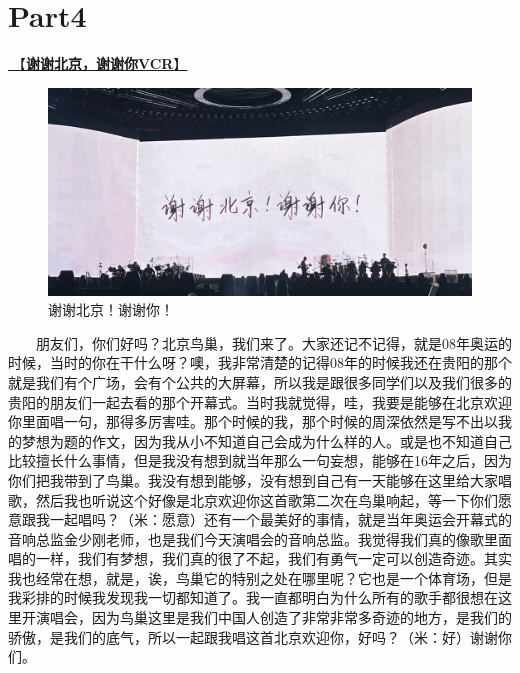 \documentclass[]{ctexbook}
\begin{document}
\newpage

\section{Part4}\label{beijing-20240921-part4}

\hyperref[thank-you-vcr]{🎥【\textbf{谢谢北京，谢谢你VCR}】}

\begin{figure}

{\centering \includegraphics[width=400pt]{img/beijing20240921/thank-beijing} 

}

\caption{谢谢北京！谢谢你！}\label{fig:unnamed-chunk-99}
\end{figure}

  朋友们，你们好吗？北京鸟巢，我们来了。大家还记不记得，就是08年奥运的时候，当时的你在干什么呀？噢，我非常清楚的记得08年的时候我还在贵阳的那个就是我们有个广场，会有个公共的大屏幕，所以我是跟很多同学们以及我们很多的贵阳的朋友们一起去看的那个开幕式。当时我就觉得，哇，我要是能够在北京欢迎你里面唱一句，那得多厉害哇。那个时候的我，那个时候的周深依然是写不出以我的梦想为题的作文，因为我从小不知道自己会成为什么样的人。或是也不知道自己比较擅长什么事情，但是我没有想到就当年那么一句妄想，能够在16年之后，因为你们把我带到了鸟巢。我没有想到能够，没有想到自己有一天能够在这里给大家唱歌，然后我也听说这个好像是北京欢迎你这首歌第二次在鸟巢响起，等一下你们愿意跟我一起唱吗？（米：愿意）还有一个最美好的事情，就是当年奥运会开幕式的音响总监金少刚老师，也是我们今天演唱会的音响总监。我觉得我们真的像歌里面唱的一样，我们有梦想，我们真的很了不起，我们有勇气一定可以创造奇迹。其实我也经常在想，就是，诶，鸟巢它的特别之处在哪里呢？它也是一个体育场，但是我彩排的时候我发现我一切都知道了。我一直都明白为什么所有的歌手都很想在这里开演唱会，因为鸟巢这里是我们中国人创造了非常非常多奇迹的地方，是我们的骄傲，是我们的底气，所以一起跟我唱这首北京欢迎你，好吗？（米：好）谢谢你们。
\end{document}
